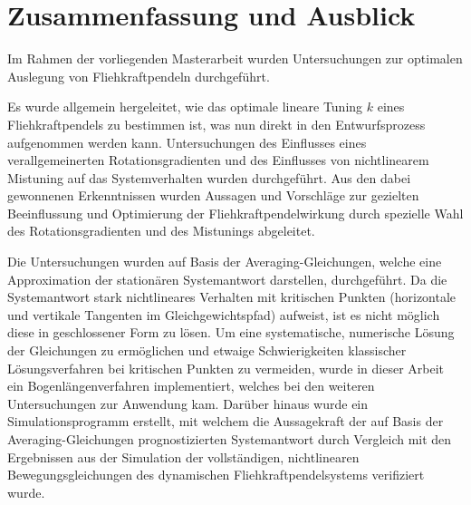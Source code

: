 \chapter{Zusammenfassung und Ausblick}
\label{cha:Schluss}

Im Rahmen der vorliegenden Masterarbeit wurden 
Untersuchungen zur optimalen Auslegung von Fliehkraftpendeln durchgeführt.


Es wurde allgemein hergeleitet, wie das optimale lineare Tuning $k$
eines Fliehkraftpendels zu bestimmen ist, was nun direkt in den Entwurfsprozess
aufgenommen werden kann.
Untersuchungen des Einflusses eines verallgemeinerten Rotationsgradienten 
und  des Einflusses von  nichtlinearem Mistuning auf das Systemverhalten wurden durchgeführt.
Aus den dabei gewonnenen Erkenntnissen wurden
Aussagen und Vorschläge zur gezielten Beeinflussung und Optimierung
der Fliehkraftpendelwirkung durch spezielle Wahl des Rotationsgradienten
und des Mistunings abgeleitet.




Die Untersuchungen wurden auf Basis der Averaging-Gleichungen, welche eine 
Approximation der stationären Systemantwort  darstellen,  durchgeführt.
Da die Systemantwort stark nichtlineares Verhalten mit kritischen Punkten
(horizontale und vertikale Tangenten im Gleichgewichtspfad) aufweist, ist
es nicht möglich diese in geschlossener Form zu lösen.
Um eine systematische, numerische Lösung der Gleichungen zu ermöglichen und etwaige 
Schwierigkeiten klassischer Lösungsverfahren bei kritischen Punkten
zu vermeiden, wurde in dieser Arbeit ein Bogenlängenverfahren implementiert,
welches bei den weiteren Untersuchungen zur Anwendung kam.
Darüber hinaus wurde ein Simulationsprogramm erstellt, 
mit welchem  die Aussagekraft der auf Basis der Averaging-Gleichungen 
prognostizierten  Systemantwort durch Vergleich mit den Ergebnissen 
aus der Simulation der vollständigen, nichtlinearen 
Bewegungsgleichungen des dynamischen Fliehkraftpendelsystems
verifiziert wurde.




